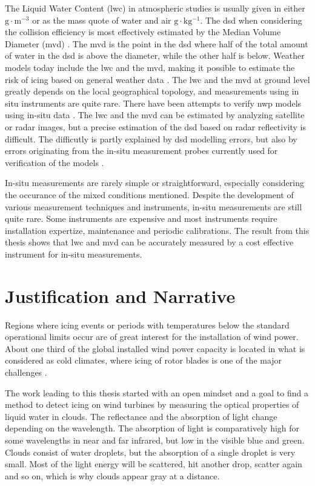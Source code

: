 The Liquid Water Content (\gls{lwc}) in atmospheric studies is usually given in either $\mathrm{g\cdot m^{-3}}$ \cite{sein1998} or as the mass quote of water and air $\mathrm{g\cdot kg^{-1}}$. The \gls{dsd} when considering the collision efficiency is most effectively estimated by the Median Volume Diameter (\gls{mvd}) \cite{fins1988}. The \gls{mvd} is the point in the \gls{dsd} where half of the total amount of water in the \gls{dsd} is above the diameter, while the other half is below. Weather models today include the \gls{lwc} and the \gls{mvd}, making it possible to estimate the risk of icing based on general weather data \cite{thomp2009}. The \gls{lwc} and the \gls{mvd} at ground level greatly depends on the local geographical topology, and measurements using in situ instruments are quite rare. There have been attempts to verify \gls{nwp} models using in-situ data \cite{berg2013}. The \gls{lwc} and the \gls{mvd} can be estimated by analyzing satellite or radar images, but a precise estimation of the \gls{dsd} based on radar reflectivity is difficult. The difficutly is partly explained by \gls{dsd} modelling errors, but also by errors originating from the in-situ measurement probes currently used for verification of the models \cite{miles2000}. 

In-situ measurements are rarely simple or straightforward, especially considering the occurance of the mixed conditions mentioned. Despite the development of various measurement techniques and instruments, in-situ measurements are still quite rare. Some instruments are expensive and most instruments require installation expertize, maintenance and periodic calibrations. The result from this thesis shows that \gls{lwc} and \gls{mvd} can be accurately measured by a cost effective instrument for in-situ measurements.

\section{Justification and Narrative}

Regions where icing events or periods with temperatures below the standard operational limits occur are of great interest for the installation of wind power. About one third of the global installed wind power capacity is located in what is considered as cold climates, where icing of rotor blades is one of the major challenges \cite{iea2017}.

The work leading to this thesis started with an open mindset and a goal to find a method to detect icing on wind turbines by measuring the optical properties of liquid water in clouds. The reflectance and the absorption of light change depending on the wavelength. The absorption of light is comparatively high for some wavelengths in near and far infrared, but low in the visible blue and green. Clouds consist of water droplets, but the absorption of a single droplet is very small. Most of the light energy will be scattered, hit another drop, scatter again and so on, which is why clouds appear gray at a distance. 

